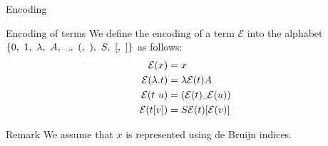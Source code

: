 \documentclass[dvipsnames]{beamer}
\newcommand{\mce}{\mathcal{E}}
\begin{document}
\begin{frame}{Encoding}
   \begin{alertblock}{Encoding of terms}
    We define the encoding of a term $\mce$ into the alphabet $\{0,~1,~\lambda,~A,~\text{\textvisiblespace},~(,~),~S,~[,~]\}$ as follows:
\begin{align*}
    \mce(x) &=x\\
    \mce(\lambda .t) &=\lambda \mce(t) A\\
    \mce(t~u)&=(\mce(t)\text{\textvisiblespace}\mce(u))\\
    \mce(t[v])&=S\mce(t)[\mce(v)]
\end{align*}
  \end{alertblock}
  \begin{block}{Remark}
    We assume that $x$ is represented using de Bruijn indices.
  \end{block}
\end{frame}
\end{document}
